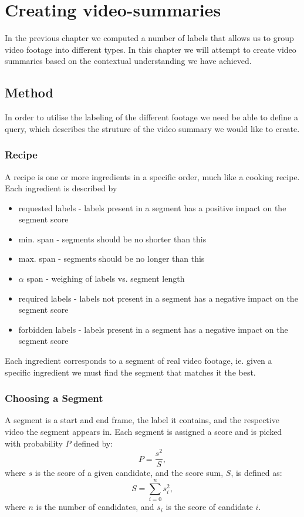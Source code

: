 %
\chapter{Creating video-summaries}
%
In the previous chapter we computed a number of labels that allows us to group video footage into different types. In this chapter we will attempt to create video summaries based on the contextual understanding we have achieved.
%
\section{Method}
%
In order to utilise the labeling of the different footage we need be able to define a query, which describes the struture of the video summary we would like to create.
%
\subsection{Recipe}
%
A recipe is one or more ingredients in a specific order, much like a cooking recipe. Each ingredient is described by
%
\begin{itemize}
\item requested labels - labels present in a segment has a positive impact on the segment score
\item min. span - segments should be no shorter than this
\item max. span - segments should be no longer than this
\item $\alpha$ span - weighing of labels vs. segment length
\item required labels - labels not present in a segment has a negative impact on the segment score
\item forbidden labels - labels present in a segment has a negative impact on the segment score
\end{itemize}
%
Each ingredient corresponds to a segment of real video footage, ie. given a specific ingredient we must find the segment that matches it the best.
%
\subsection{Choosing a Segment}
%
A segment is a start and end frame, the label it contains, and the respective video the segment appears in. Each segment is assigned a score and is picked with probability $P$ defined by: 
%
\[
P = \frac{s^2}{S},
\]
%
where $s$ is the score of a given candidate, and the score sum, $S$, is defined as:
%
\[
S = \sum_{i=0}^{n} s_{i}^2,
\]
%
where $n$ is the number of candidates, and $s_i$ is the score of candidate $i$.
%
